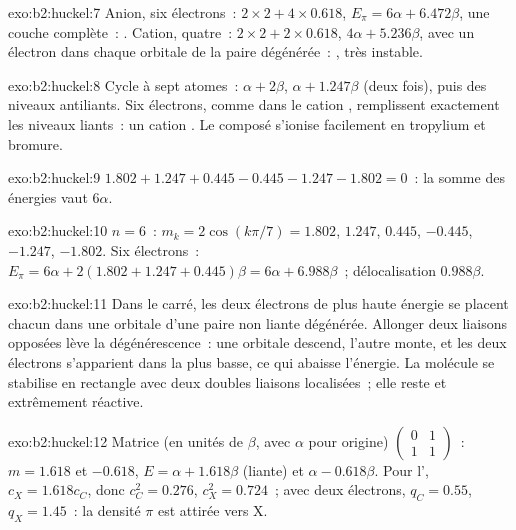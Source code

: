 \begin{solution}{exo:b2:huckel:7}
Anion, six électrons~: $2 \times 2 + 4 \times 0.618$, $E_\pi = 6\alpha + 6.472\beta$, une couche complète~:
. Cation, quatre~: $2 \times 2 + 2 \times 0.618$, $4\alpha + 5.236\beta$, avec un électron
dans chaque orbitale de la paire dégénérée~: , très instable.
\end{solution}

\begin{solution}{exo:b2:huckel:8}
Cycle à sept atomes~: $\alpha + 2\beta$, $\alpha + 1.247\beta$ (deux fois), puis des niveaux antiliants. Six
électrons, comme dans le cation , remplissent exactement les niveaux liants~: un cation
. Le composé s'ionise facilement en tropylium et bromure.
\end{solution}

\begin{solution}{exo:b2:huckel:9}
$1.802 + 1.247 + 0.445 - 0.445 - 1.247 - 1.802 = 0$~: la somme des énergies vaut $6\alpha$.
\end{solution}

\begin{solution}{exo:b2:huckel:10}
$n = 6$~: $m_k = 2\cos(k\pi/7) = 1.802$, $1.247$, $0.445$, $-0.445$, $-1.247$, $-1.802$. Six
électrons~: $E_\pi = 6\alpha + 2(1.802 + 1.247 + 0.445)\beta = 6\alpha + 6.988\beta$~;
délocalisation $0.988\beta$.
\end{solution}

\begin{solution}{exo:b2:huckel:11}
Dans le carré, les deux électrons de plus haute énergie se placent chacun dans une orbitale d'une
paire non liante dégénérée. Allonger deux liaisons opposées lève la dégénérescence~:
une orbitale descend, l'autre monte, et les deux électrons s'apparient dans la plus basse, ce qui
abaisse l'énergie. La molécule se stabilise en rectangle avec deux doubles liaisons
localisées~; elle reste  et extrêmement réactive.
\end{solution}

\begin{solution}{exo:b2:huckel:12}
Matrice (en unités de $\beta$, avec $\alpha$ pour origine) $\begin{pmatrix}0 & 1\\ 1 & 1\end{pmatrix}$~:
$m = 1.618$ et $-0.618$, $E = \alpha + 1.618\beta$ (liante) et $\alpha - 0.618\beta$. Pour
l', $c_X = 1.618c_C$, donc $c_C^2 = 0.276$, $c_X^2 = 0.724$~; avec deux électrons,
$q_C = 0.55$, $q_X = 1.45$~: la densité $\pi$ est attirée vers X.
\end{solution}

